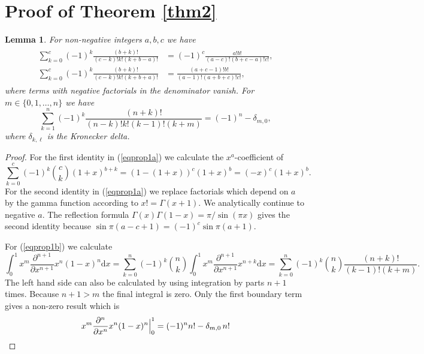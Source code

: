 \documentclass[oneside]{amsart}
\newcommand{\dd}{\mathrm{d}}
\theoremstyle{plain}
\newtheorem{lem}[thm]{Lemma}
\begin{document}
\section{Proof of Theorem \ref{thm2}}\label{sectpf2}
\begin{lem}
For non-negative integers $a,b,c$ we have
\begin{align}
\begin{aligned}
\label{eqprop1a}
\sum_{k=0}^c(-1)^k\frac{(b+k)!}{(c-k)!k!(k+b-a)!}&=(-1)^c\frac{a!b!}{(a-c)!(b+c-a)!c!},\\
\sum_{k=0}^c(-1)^k\frac{(b+k)!}{(c-k)!k!(k+b+a)!}&=\frac{(a+c-1)!b!}{(a-1)!(a+b+c)!c!},
\end{aligned}
\end{align}
where terms with negative factorials in the denominator vanish. For $m\in\{0,1,\ldots,n\}$ we have
\begin{equation}\label{eqprop1b}
\sum_{k=1}^n(-1)^k\frac{(n+k)!}{(n-k)!k!(k-1)!(k+m)}=(-1)^n-\delta_{m,0},
\end{equation}
where $\delta_{k,\ell}$ is the Kronecker delta.
\end{lem}
\begin{proof}
For the first identity in (\ref{eqprop1a}) we calculate the $x^a$-coefficient of
$$
\sum_{k=0}^c(-1)^k\genfrac(){0pt}{}ck(1+x)^{b+k}=(1-(1+x))^c(1+x)^b=(-x)^c(1+x)^b.
$$
For the second identity in (\ref{eqprop1a}) we replace factorials which depend on $a$ by the gamma function according to $x!=\Gamma(x+1)$.
We analytically continue to negative $a$. The reflection formula $\Gamma(x)\Gamma(1-x)=\pi/\sin(\pi x)$ gives the second identity because
$\sin\pi(a-c+1)=(-1)^c\sin\pi(a+1)$.

For (\ref{eqprop1b}) we calculate
$$
\int_0^1x^m\frac{\partial^{n+1}}{\partial x^{n+1}}x^n(1-x)^n\dd x=\sum_{k=0}^n(-1)^k\genfrac(){0pt}{}nk\int_0^1x^m\frac{\partial^{n+1}}{\partial x^{n+1}}x^{n+k}\dd x=
\sum_{k=0}^n(-1)^k\genfrac(){0pt}{}nk\frac{(n+k)!}{(k-1)!(k+m)}.
$$
The left hand side can also be calculated by using integration by parts $n+1$ times. Because $n+1>m$ the final integral is zero. Only the first boundary term gives a non-zero
result which is
\begin{gather*}
x^m\frac{\partial^n}{\partial x^n}x^n(1-x)^n\Big|_0^1=(-1)^nn!-\delta_{m,0}\,n!
\qedhere
\end{gather*}
\end{proof}
\end{document}
